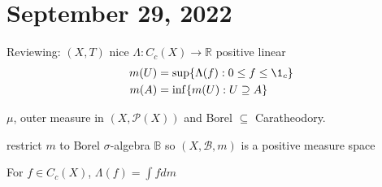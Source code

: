 \section{ September 29, 2022 }

Reviewing: $(X,T)$ nice $\Lambda : C_c (X) \to \mathbb{R}$ positive linear
\begin{align*}
	m(U) &= \sup\{\Lambda(f) : 0 \leq f \leq \1_c\} \\
	m(A) &= \inf\{m(U) : U \contains  A\}
\end{align*}

\begin{lemma}
	$\mu$, outer measure in  $(X,\mathcal{P}(X))$ and Borel $\subseteq$ Caratheodory.
\end{lemma}

\begin{lemma}
	restrict $m$ to Borel $\sigma$-algebra $\mathbb{B}$ so $(X, \mathcal{B}, m)$ is a positive measure space
\end{lemma}

\begin{lemma}
	For $f \in C_c (X)$, $\Lambda(f) = \int f dm$
\end{lemma}

